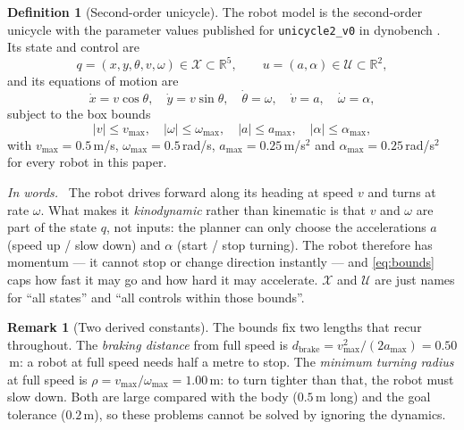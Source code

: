 \documentclass[conference]{IEEEtran}
\theoremstyle{plain}
\theoremstyle{definition}
\newtheorem{definition}{Definition}
\newtheorem{remark}{Remark}
\newcommand{\inwords}{\par\smallskip\noindent\textit{In words.}\ }
\newcommand{\R}{\mathbb{R}}
\newcommand{\X}{\mathcal{X}}
\newcommand{\Uc}{\mathcal{U}}
\begin{document}
\begin{definition}[Second-order unicycle]
\label{def:robot}
The robot model is the second-order unicycle with the parameter values published for
\texttt{unicycle2\_v0} in dynobench \cite{dynobench}. Its state and control are
\[
  q = (x,y,\theta,v,\omega) \in \X \subset \R^5,
  \qquad
  u = (a,\alpha) \in \Uc \subset \R^2 ,
\]
and its equations of motion are
\begin{equation}
  \dot x = v\cos\theta,\quad
  \dot y = v\sin\theta,\quad
  \dot\theta = \omega,\quad
  \dot v = a,\quad
  \dot\omega = \alpha ,
  \label{eq:dyn}
\end{equation}
subject to the box bounds
\begin{equation}
  |v| \le v_{\max},\quad |\omega| \le \omega_{\max},\quad
  |a| \le a_{\max},\quad |\alpha| \le \alpha_{\max},
  \label{eq:bounds}
\end{equation}
with $v_{\max}=0.5$\,m/s, $\omega_{\max}=0.5$\,rad/s, $a_{\max}=0.25$\,m/s$^2$ and
$\alpha_{\max}=0.25$\,rad/s$^2$ for every robot in this paper.
\inwords
The robot drives forward along its heading at speed $v$ and turns at rate $\omega$. What
makes it \emph{kinodynamic} rather than kinematic is that $v$ and $\omega$ are part of the
state $q$, not inputs: the planner can only choose the accelerations $a$ (speed up / slow
down) and $\alpha$ (start / stop turning). The robot therefore has momentum --- it cannot
stop or change direction instantly --- and \eqref{eq:bounds} caps how fast it may go and how
hard it may accelerate. $\X$ and $\Uc$ are just names for ``all states'' and ``all controls
within those bounds''.
\end{definition}

\begin{remark}[Two derived constants]
The bounds fix two lengths that recur throughout. The \emph{braking distance} from full
speed is $d_{\text{brake}} = v_{\max}^2/(2a_{\max}) = 0.50$\,m: a robot at full speed needs
half a metre to stop. The \emph{minimum turning radius} at full speed is
$\rho = v_{\max}/\omega_{\max} = 1.00$\,m: to turn tighter than that, the robot must slow
down. Both are large compared with the body ($0.5$\,m long) and the goal tolerance
($0.2$\,m), so these problems cannot be solved by ignoring the dynamics.
\end{remark}
\end{document}
